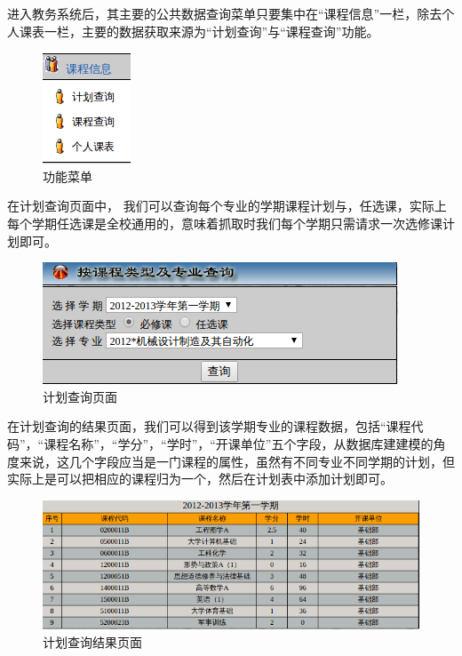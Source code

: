 \documentclass[UTF8, zihao=-4, heading=false]{ctexart}
\begin{document}
    进入教务系统后，其主要的公共数据查询菜单只要集中在“课程信息”一栏，除去个人课表一栏，主要的数据获取来源为“计划查询”与“课程查询”功能。\par
    
    \begin{figure}
        \centering
        \includegraphics[width=0.5\linewidth]{figure/interface-menu}
        \caption{功能菜单}
        \label{fig:interface-menu}
    \end{figure}
    
    在计划查询页面中， 我们可以查询每个专业的学期课程计划与，任选课，实际上每个学期任选课是全校通用的，意味着抓取时我们每个学期只需请求一次选修课计划即可。\par
    
    \begin{figure}
        \centering
        \includegraphics[width=0.5\linewidth]{figure/interface-plan}
        \caption{计划查询页面}
        \label{fig:interface-plan}
    \end{figure}
    
    在计划查询的结果页面，我们可以得到该学期专业的课程数据，包括“课程代码”，“课程名称”，“学分”，“学时”，“开课单位”五个字段，从数据库建建模的角度来说，这几个字段应当是一门课程的属性，虽然有不同专业不同学期的计划，但实际上是可以把相应的课程归为一个，然后在计划表中添加计划即可。\par

    \begin{figure}
        \centering
        \includegraphics[width=0.5\linewidth]{figure/interface-plan-result}
        \caption{计划查询结果页面}
        \label{fig:interface-plan-result}
    \end{figure}
    
\end{document}
